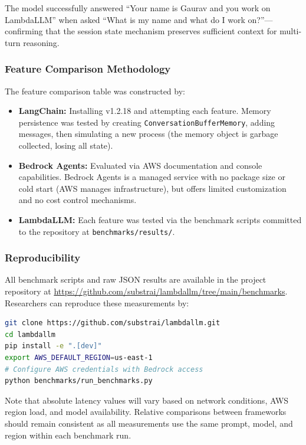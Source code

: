 \documentclass[10pt,twocolumn,letterpaper]{article}
\begin{document}
The model successfully answered ``Your name is Gaurav and you work on LambdaLLM'' when asked ``What is my name and what do I work on?''---confirming that the session state mechanism preserves sufficient context for multi-turn reasoning.

\subsubsection{Feature Comparison Methodology}

The feature comparison table was constructed by:

\begin{itemize}[leftmargin=*,itemsep=1pt,topsep=2pt]
    \item \textbf{LangChain:} Installing v1.2.18 and attempting each feature. Memory persistence was tested by creating \texttt{ConversationBufferMemory}, adding messages, then simulating a new process (the memory object is garbage collected, losing all state).
    \item \textbf{Bedrock Agents:} Evaluated via AWS documentation and console capabilities. Bedrock Agents is a managed service with no package size or cold start (AWS manages infrastructure), but offers limited customization and no cost control mechanisms.
    \item \textbf{LambdaLLM:} Each feature was tested via the benchmark scripts committed to the repository at \texttt{benchmarks/results/}.
\end{itemize}

\subsubsection{Reproducibility}

All benchmark scripts and raw JSON results are available in the project repository at \url{https://github.com/substrai/lambdallm/tree/main/benchmarks}. Researchers can reproduce these measurements by:

\begin{lstlisting}[language=bash]
git clone https://github.com/substrai/lambdallm.git
cd lambdallm
pip install -e ".[dev]"
export AWS_DEFAULT_REGION=us-east-1
# Configure AWS credentials with Bedrock access
python benchmarks/run_benchmarks.py
\end{lstlisting}

Note that absolute latency values will vary based on network conditions, AWS region load, and model availability. Relative comparisons between frameworks should remain consistent as all measurements use the same prompt, model, and region within each benchmark run.
\end{document}
